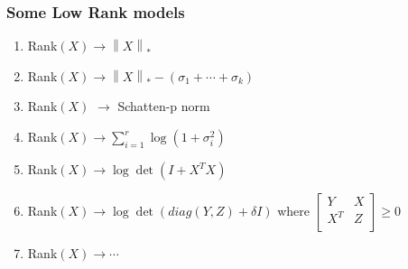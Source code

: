 \documentclass[aspectratio=2516]{beamer}
\begin{document}

\begin{frame}
\frametitle{Some Low Rank models}

\vspace{0.25cm}

\begin{enumerate}
	\item Rank$\left( X \right) \to{\left\| X \right\|_*}$
	\item Rank$\left( X \right) \to {\left\| X \right\|_*} - \left( {{\sigma _1} +  \cdots  + {\sigma _k}} \right)$
	\item Rank$\left( X \right) $ $ \to $ Schatten-p norm
	\item Rank$\left( X \right) \to \sum\limits_{i = 1}^r {\log \left( {1 + \sigma _i^2} \right)} $
	\item Rank$\left( X \right) \to \log \det \left( {I + {X^T}X} \right)$
	\item Rank$\left( X \right) \to \log \det \left( {diag\left( {Y,Z} \right) + \delta I} \right) $ 
	where $\left[ {\begin{matrix}
		Y & X  \\ 
		{{X^T}} & Z  \\ 
		
		\end{matrix} } \right] \geqslant 0$
	\item Rank$\left( X \right) \to  \cdots $
\end{enumerate}

\label{page13}

\end{frame}
\end{document}
